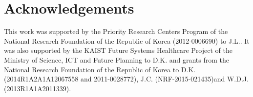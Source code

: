 \section*{Acknowledgements}

This work was supported by the Priority Research Centers Program of the National Research Foundation of the Republic of Korea (2012-0006690) to J.L.. It was also supported by the KAIST Future Systems Healthcare Project of the Ministry of Science, ICT and Future Planning to D.K. and grants from the National Research Foundation of the Republic of Korea to D.K. (2014R1A2A1A12067558 and 2011-0028772), J.C. (NRF-2015-021435)and W.D.J. (2013R1A1A2011339).
